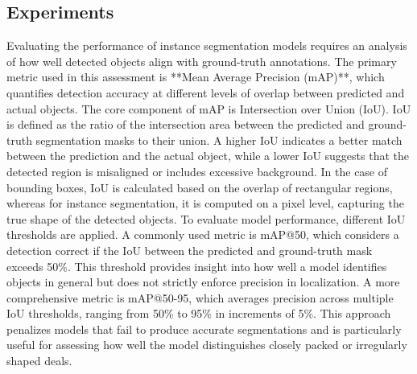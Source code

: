 \documentclass[11pt]{article}
\begin{document}
\subsection{Experiments}
Evaluating the performance of instance segmentation models requires an analysis of how well detected objects align with ground-truth annotations. The primary metric used in this assessment is **Mean Average Precision (mAP)**, which quantifies detection accuracy at different levels of overlap between predicted and actual objects. The core component of mAP is Intersection over Union (IoU). IoU is defined as the ratio of the intersection area between the predicted and ground-truth segmentation masks to their union. A higher IoU indicates a better match between the prediction and the actual object, while a lower IoU suggests that the detected region is misaligned or includes excessive background. In the case of bounding boxes, IoU is calculated based on the overlap of rectangular regions, whereas for instance segmentation, it is computed on a pixel level, capturing the true shape of the detected objects. To evaluate model performance, different IoU thresholds are applied. A commonly used metric is mAP@50, which considers a detection correct if the IoU between the predicted and ground-truth mask exceeds 50\%. This threshold provides insight into how well a model identifies objects in general but does not strictly enforce precision in localization. A more comprehensive metric is mAP@50-95, which averages precision across multiple IoU thresholds, ranging from 50\% to 95\% in increments of 5\%. This approach penalizes models that fail to produce accurate segmentations and is particularly useful for assessing how well the model distinguishes closely packed or irregularly shaped deals.
\end{document}
